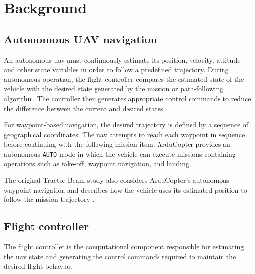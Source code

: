 \section{Background} 

\subsection{Autonomous UAV navigation}
An autonomous \gls{uav} must continuously estimate its position, velocity, attitude and other state variables in order to follow a predefined trajectory.
During autonomous operation, the flight controller compares the estimated state of the vehicle with the desired state generated by the mission or path-following algorithm.
The controller then generates appropriate control commands to reduce the difference between the current and desired states.

For waypoint-based navigation, the desired trajectory is defined by a sequence of geographical coordinates.
The \gls{uav} attempts to reach each waypoint in sequence before continuing with the following mission item. ArduCopter provides an autonomous \texttt{AUTO} mode in which the vehicle can execute missions containing operations such as take-off, waypoint navigation, and landing.

The original Tractor Beam study also considers ArduCopter's autonomous waypoint navigation and describes how the vehicle uses its estimated position to follow the mission trajectory \cite{noh2019tractorbeam}.

\subsection{Flight controller}
The flight controller is the computational component responsible for estimating the \gls{uav} state and generating the control commands required to maintain the desired flight behavior.

